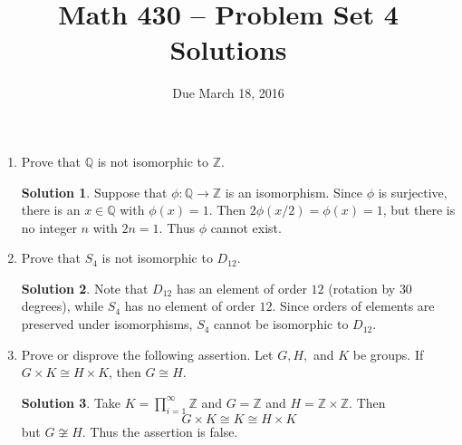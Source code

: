 \documentclass{article}
\title{Math 430 -- Problem Set 4 Solutions}
\date{Due March 18, 2016}
\newcommand{\QQ}{\mathbb{Q}}
\newcommand{\ZZ}{\mathbb{Z}}
\theoremstyle{definition}
\newtheorem*{solution}{Solution}
\begin{document}
\maketitle


\begin{enumerate}
\item[9.8.] Prove that $\QQ$ is not isomorphic to $\ZZ$.
\begin{solution} 
Suppose that $\phi : \QQ \to \ZZ$ is an isomorphism.  Since $\phi$ is surjective, there is an $x \in \QQ$ with $\phi(x) = 1$.  Then $2 \phi(x/2) = \phi(x) = 1$, but there is no integer $n$ with $2n = 1$.  Thus $\phi$ cannot exist.
\end{solution}
\item[9.12.] Prove that $S_4$ is not isomorphic to $D_{12}$.
\begin{solution}
Note that $D_{12}$ has an element of order $12$ (rotation by $30$ degrees), while $S_4$ has no element of order $12$.  Since orders of elements are preserved under isomorphisms, $S_4$ cannot be isomorphic to $D_{12}$.
\end{solution}
\item[9.23.] Prove or disprove the following assertion.  Let $G, H,$ and $K$ be groups. If $G \times K \cong H \times K$, then $G \cong H$.
\begin{solution}
Take $K = \prod_{i=1}^\infty \ZZ$ and $G = \ZZ$ and $H = \ZZ \times \ZZ$.  Then
\[
G \times K \cong K \cong H \times K
\]
but $G \not\cong H$.  Thus the assertion is false.


\end{solution}
\end{enumerate}
\end{document}
